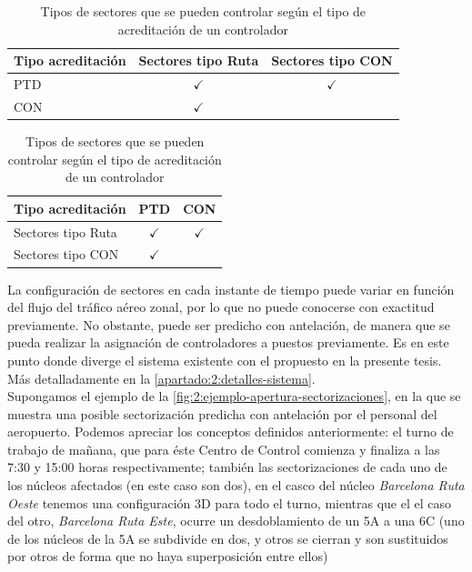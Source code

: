 \begin{table}[h]
    \centering
    \caption{Tipos de sectores que se pueden controlar según el tipo de acreditación de un controlador}
    \begin{tabular}{lcc}
    	\hline
    	\textbf{Tipo acreditación} & \textbf{Sectores tipo Ruta} & \textbf{Sectores tipo CON} \\ \hline
    	PTD                        &        $\checkmark$         &        $\checkmark$        \\
    	CON                        &        $\checkmark$         &                            \\ \hline
    \end{tabular}
    \label{table:2:acreditaciones}
\end{table}
\begin{table}[h]
	\centering
	\caption{Tipos de sectores que se pueden controlar según el tipo de acreditación de un controlador}
	\begin{tabular}{lcc}
		\hline
		\textbf{Tipo acreditación} & \textbf{PTD} & \textbf{CON} \\ \hline
		Sectores tipo Ruta         & $\checkmark$ & $\checkmark$ \\
		Sectores tipo CON          & $\checkmark$ &              \\ \hline		
	\end{tabular}
	\label{table:2:acreditaciones2}
\end{table}


La configuración de sectores en cada instante de tiempo puede variar en función del flujo del tráfico aéreo zonal, por 
lo que no puede conocerse con exactitud previamente. No obstante, puede ser predicho con antelación, de manera que 
se pueda realizar la asignación de controladores a puestos previamente.
Es en este punto donde diverge el sistema existente con el propuesto en la presente tesis. Más detalladamente en la 
\autoref{apartado:2:detalles-sistema}.
\\

Supongamos el ejemplo de la \autoref{fig:2:ejemplo-apertura-sectorizaciones}, en la que se muestra una posible 
sectorización predicha 
con antelación por el personal del aeropuerto. Podemos apreciar los conceptos definidos anteriormente: el turno de 
trabajo de mañana, que para éste \gls{Centro de Control} comienza y finaliza a las 7:30 y 15:00 horas respectivamente; 
también las sectorizaciones de cada uno de los núcleos afectados (en este caso son dos), en el casco del núcleo 
\textit{Barcelona Ruta Oeste} tenemos una configuración 3D para todo el turno, mientras que el el caso del otro, 
\textit{Barcelona Ruta Este}, ocurre un desdoblamiento de un 5A a una 6C (uno de los núcleos de la 5A se subdivide en 
dos, y otros se cierran y son sustituidos por otros de forma que no haya superposición entre ellos)

